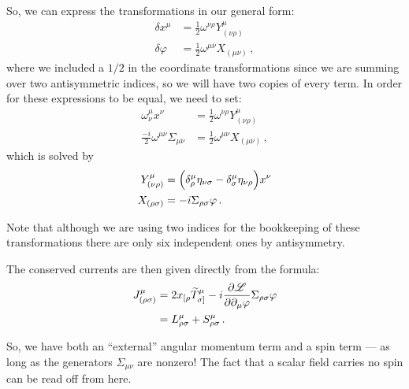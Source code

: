 \documentclass[main.tex]{subfiles}
\begin{document}
So, we can express the transformations in our general form:
%
\begin{align}
\delta x^{\mu } &= \frac{1}{2} \omega^{\nu \rho } Y^{\mu }_{(\nu \rho )}  \\
\delta \varphi  &= \frac{1}{2} \omega^{\mu \nu } X_{(\mu \nu )}
\,,
\end{align}
%
where we included a \(1/2\) in the coordinate transformations since we are summing over two antisymmetric indices, so we will have two copies of every term. In order for these expressions to be equal, we need to set: 
%
\begin{align}
\omega^{\mu }_{\nu }x^{\nu } &= \frac{1}{2} \omega^{\nu \rho } Y^{\mu }_{(\nu \rho )}  \\
\frac{-i}{2} \omega^{\mu \nu } \Sigma_{\mu \nu } &=\frac{1}{2} \omega^{\mu \nu } X_{(\mu \nu )}
\,,
\end{align}
%
which is solved by 
%
\begin{align}
Y^{\mu }_{(\nu \rho )} &= \qty(\delta ^{\mu }_{\rho } \eta_{\nu \sigma } - \delta ^{\mu }_{\sigma } \eta_{\nu \rho })x^{\nu }  \\
X_{(\rho \sigma )} &= -i \Sigma_{\rho \sigma }
\varphi 
\,.
\end{align}

Note that although we are using two indices for the bookkeeping of these transformations there are only six independent ones by antisymmetry. 

The conserved currents are then given directly from the formula: 
%
\begin{align}
J^{\mu }_{(\rho \sigma )} &= 2 x_{[\rho } \widetilde{T}_{\sigma ]}^{\mu } - i \pdv{\mathscr{L}}{\partial_{\mu }\varphi } \Sigma_{\rho \sigma } \varphi  \label{eq:conserved-currents-Lorentz}\\
&= L^{\mu }_{\rho \sigma } + S^{\mu }_{\rho \sigma }
\,.
\end{align}


So, we have both an ``external'' angular momentum term and a spin term --- as long as the generators \(\Sigma_{\mu  \nu }\) are nonzero! The fact that a scalar field carries no spin can be read off from here. 
\end{document}

